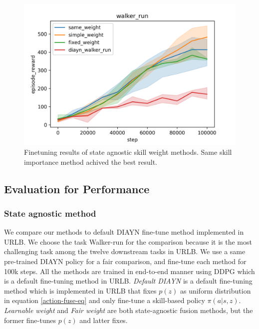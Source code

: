 \begin{figure}[ht]
    \vskip 0.2in
    \begin{center}
    \centerline{\includegraphics[width=\columnwidth]{Figures/multiple_seed_state_agnostic_methods.png}}
    \caption{Finetuning results of state agnostic skill weight methods. Same skill importance method achived the best result.}
    \label{state agnostic results}
    \end{center}
    \vskip -0.2in
\end{figure}



\subsection{Evaluation for Performance}

\subsubsection{State agnostic method}
We compare our methods to default DIAYN fine-tune method implemented in URLB.
We choose the task Walker-run for the comparison because it is the most challenging task among the twelve downstream tasks in URLB.
We use a same pre-trained DIAYN policy for a fair comparison, and fine-tune each method for 100k steps.
All the methods are trained in end-to-end manner using DDPG which is a default fine-tuning method in URLB.
\emph{Default DIAYN} is a default fine-tuning method which is implemented in URLB that fixes $p(z)$ as uniform distribution in equation \ref{action-fuse-eq} and only fine-tune a skill-based policy $\pi(a|s,z)$.
\emph{Learnable weight} and \emph{Fair weight} are both state-agnostic fusion methods, but the former fine-tunes $p(z)$ and latter fixes.

